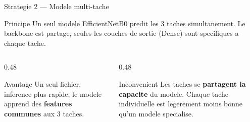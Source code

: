 \documentclass[aspectratio=169, 12pt]{beamer}
\begin{document}
\begin{frame}{Strategie 2 --- Modele multi-tache}

\begin{block}{Principe}
{\small Un seul modele EfficientNetB0 predit les 3 taches simultanement. Le backbone est partage, seules les couches de sortie (Dense) sont specifiques a chaque tache.}
\end{block}

\vspace{0.3cm}

\begin{columns}[T]
\begin{column}{0.48\textwidth}
\begin{exampleblock}{Avantage}
{\small Un seul fichier, inference plus rapide, le modele apprend des \textbf{features communes} aux 3 taches.}
\end{exampleblock}
\end{column}
\begin{column}{0.48\textwidth}
\begin{alertblock}{Inconvenient}
{\small Les taches se \textbf{partagent la capacite} du modele. Chaque tache individuelle est legerement moins bonne qu'un modele specialise.}
\end{alertblock}
\end{column}
\end{columns}
\end{frame}
\end{document}
